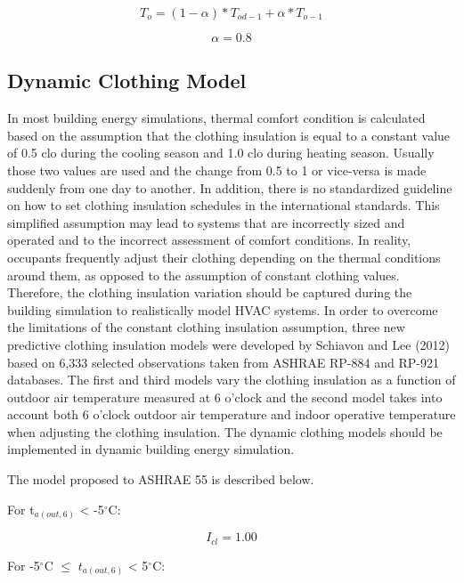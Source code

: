 \begin{equation}
T_{o} = (1 - \alpha) * T_{od-1} + \alpha * T_{o-1}
\end{equation}

\begin{equation}
\alpha = 0.8
\end{equation}

\subsection{Dynamic Clothing Model}\label{dynamic-clothing-model}

In most building energy simulations, thermal comfort condition is calculated based on the assumption that the clothing insulation is equal to a constant value of 0.5 clo during the cooling season and 1.0 clo during heating season. Usually those two values are used and the change from 0.5 to 1 or vice-versa is made suddenly from one day to another. In addition, there is no standardized guideline on how to set clothing insulation schedules in the international standards. This simplified assumption may lead to systems that are incorrectly sized and operated and to the incorrect assessment of comfort conditions. In reality, occupants frequently adjust their clothing depending on the thermal conditions around them, as opposed to the assumption of constant clothing values. Therefore, the clothing insulation variation should be captured during the building simulation to realistically model HVAC systems. In order to overcome the limitations of the constant clothing insulation assumption, three new predictive clothing insulation models were developed by Schiavon and Lee (2012) based on 6,333 selected observations taken from ASHRAE RP-884 and RP-921 databases. The first and third models vary the clothing insulation as a function of outdoor air temperature measured at 6 o'clock and the second model takes into account both 6 o'clock outdoor air temperature and indoor operative temperature when adjusting the clothing insulation. The dynamic clothing models should be implemented in dynamic building energy simulation.

The model proposed to ASHRAE 55 is described below.

For t\(_{a(out,6)}\) \textless{} -5\(^{\circ}\)C:

\begin{equation}
{I_{cl}} = 1.00
\end{equation}

For -5\(^{\circ}\)C \(\leq\) \(t_{a(out,6)}\) \textless{} 5\(^{\circ}\)C:

